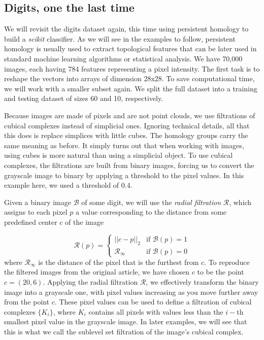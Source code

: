 \subsection{Digits, one the last time}
We will revisit the digits dataset again, this time using persistent homology to build a \textit{scikit} classifier. As we will see in the examples to follow, persistent homology is usually used to extract topological features that can be later used in standard machine learning algorithms or statistical analysis. We have 70,000 images, each having 784 features representing a pixel intensity. The first task is to reshape the vectors into arrays of dimension 28x28. To save computational time, we will work with a smaller subset again. We split the full dataset into a training and testing dataset of sizes 60 and 10, respectively.

Because images are made of pixels and are not point clouds, we use filtrations of cubical complexes instead of simplicial ones. Ignoring technical details, all that this does is replace simplices with little cubes. The homology groups carry the same meaning as before. It simply turns out that when working with images, using cubes is more natural than using a simplicial object. To use cubical complexes, the filtrations are built from binary images, forcing us to convert the grayscale image to binary by applying a threshold to the pixel values. In this example here, we used a threshold of 0.4.

Given a binary image $\mathcal{B}$ of some digit, we will use the \textit{radial filtration} $\mathcal{R}$, which assigns to each pixel $p$ a value corresponding to the distance from some predefined center $c$ of the image

\begin{equation*}
  \mathcal{R}(p) =
  \left\{
    \begin{array}{ll}
      ||c-p||_{2} & \mbox{if } \mathcal{B}(p) = 1 \\
      \mathcal{R}_{\infty} & \mbox{if } \mathcal{B}(p) = 0
    \end{array}
  \right.
\end{equation*}
where $\mathcal{R}_{\infty}$ is the distance of the pixel that is the furthest from $c$. To reproduce the filtered images from the original article, we have chosen $c$ to be the point $c = (20, 6)$. Applying the radial filtration $\mathcal{R}$, we effectively transform the binary image into a grayscale one, with pixel values increasing as you move further away from the point $c$. These pixel values can be used to define a filtration of cubical complexes $\{K_{i}\}$, where $K_{i}$ contains all pixels with values less than the $i-$th smallest pixel value in the grayscale image. In later examples, we will see that this is what we call the sublevel set filtration of the image's cubical complex.

